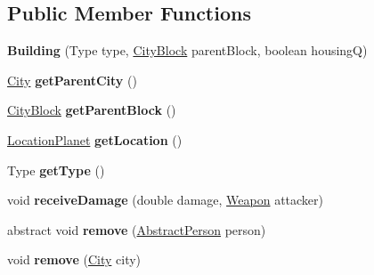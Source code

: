 \subsection*{Public Member Functions}
\begin{DoxyCompactItemize}
\item 
{\bfseries Building} (Type type, \hyperlink{classcities_1_1_city_block}{City\+Block} parent\+Block, boolean housingQ)\hypertarget{classbuildings_1_1_building_a62f7e9cf25af8e26d16272b938b26113}{}\label{classbuildings_1_1_building_a62f7e9cf25af8e26d16272b938b26113}

\item 
\hyperlink{classcities_1_1_city}{City} {\bfseries get\+Parent\+City} ()\hypertarget{classbuildings_1_1_building_a103aed9a83c1eb52259054c87d4ee988}{}\label{classbuildings_1_1_building_a103aed9a83c1eb52259054c87d4ee988}

\item 
\hyperlink{classcities_1_1_city_block}{City\+Block} {\bfseries get\+Parent\+Block} ()\hypertarget{classbuildings_1_1_building_af81b33ec16c6dcd9d1876b9215edbd55}{}\label{classbuildings_1_1_building_af81b33ec16c6dcd9d1876b9215edbd55}

\item 
\hyperlink{classplanets_1_1_location_planet}{Location\+Planet} {\bfseries get\+Location} ()\hypertarget{classbuildings_1_1_building_a141c99986232d82dc74d60a888ffc509}{}\label{classbuildings_1_1_building_a141c99986232d82dc74d60a888ffc509}

\item 
Type {\bfseries get\+Type} ()\hypertarget{classbuildings_1_1_building_a4e8bac088153f58ebbb4d78b674f5e8f}{}\label{classbuildings_1_1_building_a4e8bac088153f58ebbb4d78b674f5e8f}

\item 
void {\bfseries receive\+Damage} (double damage, \hyperlink{classtools_1_1weapons_1_1_weapon}{Weapon} attacker)\hypertarget{classbuildings_1_1_building_acad0ddca17484867867d4fa17cc34812}{}\label{classbuildings_1_1_building_acad0ddca17484867867d4fa17cc34812}

\item 
abstract void {\bfseries remove} (\hyperlink{classpeople_1_1_abstract_person}{Abstract\+Person} person)\hypertarget{classbuildings_1_1_building_af44cc510f7f80c8215c76b031aea6fbb}{}\label{classbuildings_1_1_building_af44cc510f7f80c8215c76b031aea6fbb}

\item 
void {\bfseries remove} (\hyperlink{classcities_1_1_city}{City} city)\hypertarget{classbuildings_1_1_building_a5e9a7faba6afcc335d63dd398cf41c66}{}\label{classbuildings_1_1_building_a5e9a7faba6afcc335d63dd398cf41c66}

\end{DoxyCompactItemize}

